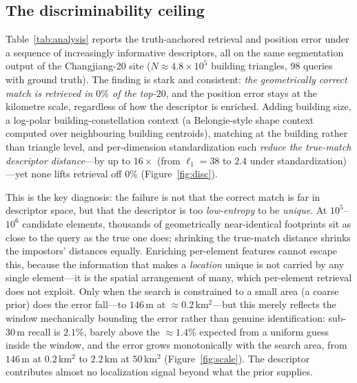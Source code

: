 \documentclass[10pt]{article}
\theoremstyle{plain}
\theoremstyle{definition}
\begin{document}
\subsection{The discriminability ceiling}
\label{sec:analysis}

Table~\ref{tab:analysis} reports the truth-anchored retrieval and position
error under a sequence of increasingly informative descriptors, all on the same
segmentation output of the Changjiang-20 site ($N\!\approx\!4.8\times10^{5}$
building triangles, $98$ queries with ground truth).
The finding is stark and consistent: \emph{the geometrically correct match is
retrieved in $0\%$ of the top-$20$}, and the position error stays at the
kilometre scale, regardless of how the descriptor is enriched.
Adding building size, a log-polar building-constellation context (a
Belongie-style shape context~\cite{belongie2002shape} computed over neighbouring
building centroids), matching at the building rather than triangle level, and
per-dimension standardization each \emph{reduce the true-match descriptor
distance}---by up to $16\times$ (from $\ell_1\!=\!38$ to $2.4$ under
standardization)---yet none lifts retrieval off $0\%$ (Figure~\ref{fig:disc}).

This is the key diagnosis: the failure is not that the correct match is far in
descriptor space, but that the descriptor is too \emph{low-entropy} to be
\emph{unique}. At $10^{5}$--$10^{6}$ candidate elements, thousands of
geometrically near-identical footprints sit as close to the query as the true
one does; shrinking the true-match distance shrinks the impostors' distances
equally. Enriching per-element features cannot escape this, because the
information that makes a \emph{location} unique is not carried by any single
element---it is the spatial arrangement of many, which per-element retrieval
does not exploit.
Only when the search is constrained to a small area (a coarse prior) does the
error fall---to $146$\,m at ${\approx}0.2$\,km$^{2}$---but this merely reflects
the window mechanically bounding the error rather than genuine identification:
sub-$30$\,m recall is $2.1\%$, barely above the ${\approx}1.4\%$ expected from a
uniform guess inside the window, and the error grows monotonically with the
search area, from $146$\,m at $0.2$\,km$^{2}$ to $2.2$\,km at $50$\,km$^{2}$
(Figure~\ref{fig:scale}). The descriptor contributes almost no localization
signal beyond what the prior supplies.
\end{document}
